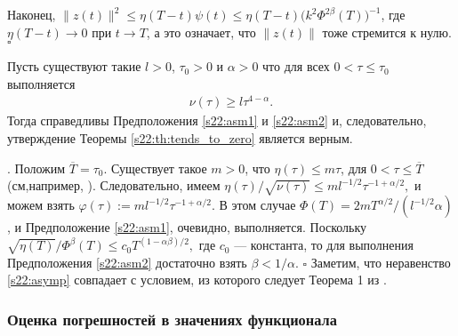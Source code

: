 \documentclass[../main.tex]{subfiles}
\begin{document}
Наконец, $ \|z(t)\|^2 \leqslant \eta(T-t)\psi(t) \leqslant \eta(T-t)\big(k^2\Phi^{2\beta}(T)\big)^{-1} $, 
где $\eta(T-t) \to 0$ при $t \to T$, а это означает, что $\|z(t)\|$ тоже стремится к нулю.
    \hfill $ \square $
\begin{corollary}%
Пусть существуют такие $ l > 0$, $\tau_0 > 0$ и $\alpha > 0$ что для всех $0 < \tau \leqslant \tau_0 $ выполняется
        \begin{gather}\label{s22:asymp}
            \nu(\tau)\geqslant l\tau^{4-\alpha}.
        \end{gather}
 Тогда справедливы Предположения \ref{s22:asm1} и \ref{s22:asm2} и, следовательно, утверждение Теоремы \ref{s22:th:tends_to_zero} является верным.
\end{corollary}
\doc. 
Положим $\overline{T}=\tau_0$. 
Существует такое $m>0$, что $\eta(\tau)\leqslant m \tau$,  для $0 < \tau \leqslant\overline{T}$ (см,например, \cite{GusevOsipov}). 
Следовательно, имеем $
\eta(\tau)/\sqrt{\nu(\tau)} \leqslant  
     ml^{-1/2}\tau^{-1+\alpha/2},$
и можем взять  $\varphi(\tau):=  
     ml^{-1/2}\tau^{-1+\alpha/2}$. 
В этом случае 
$\Phi(T)=2mT^{\alpha/2}/(l^{-1/2}\alpha)$, и Предположение \ref{s22:asm1}, очевидно, выполняется. 
Поскольку 
$\sqrt{\eta(T)}/\Phi^\beta(T) \leqslant c_0T^{(1-\alpha\beta)/2},$
где $c_0$ --- константа, то для выполнения Предположения  \ref{s22:asm2} достаточно взять $\beta < 1/\alpha$.
    \hfill $ \square $
Заметим, что неравенство \eqref{s22:asymp} совпадает с условием, из которого следует Теорема 1 из \cite{GusevOsipov}.

\subsubsection{Оценка погрешностей в значениях функционала}
\end{document}
